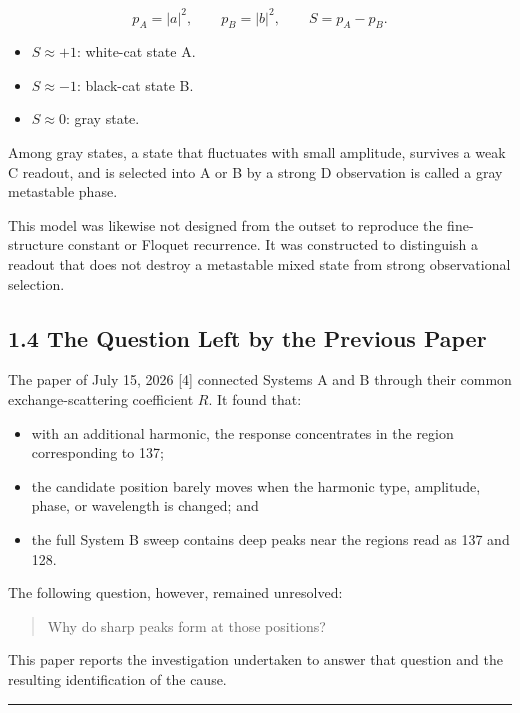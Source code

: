 \documentclass[
  10pt,
  a4paper,
]{article}
\providecommand{\tightlist}{%
  \setlength{\itemsep}{0pt}\setlength{\parskip}{0pt}}
\begin{document}
\[
p_A=|a|^2,\qquad
p_B=|b|^2,\qquad
S=p_A-p_B.
\]

\begin{itemize}
\tightlist
\item
  \(S\approx+1\): white-cat state A.
\item
  \(S\approx-1\): black-cat state B.
\item
  \(S\approx0\): gray state.
\end{itemize}

Among gray states, a state that fluctuates with small amplitude,
survives a weak C readout, and is selected into A or B by a strong D
observation is called a gray metastable phase.

This model was likewise not designed from the outset to reproduce the
fine-structure constant or Floquet recurrence. It was constructed to
distinguish a readout that does not destroy a metastable mixed state
from strong observational selection.

\subsection{1.4 The Question Left by the Previous
Paper}\label{the-question-left-by-the-previous-paper}

The paper of July 15, 2026 {[}4{]} connected Systems A and B through
their common exchange-scattering coefficient \(R\). It found that:

\begin{itemize}
\tightlist
\item
  with an additional harmonic, the response concentrates in the region
  corresponding to 137;
\item
  the candidate position barely moves when the harmonic type, amplitude,
  phase, or wavelength is changed; and
\item
  the full System B sweep contains deep peaks near the regions read as
  137 and 128.
\end{itemize}

The following question, however, remained unresolved:

\begin{quote}
Why do sharp peaks form at those positions?
\end{quote}

This paper reports the investigation undertaken to answer that question
and the resulting identification of the cause.

\begin{center}\rule{0.5\linewidth}{0.5pt}\end{center}
\end{document}
